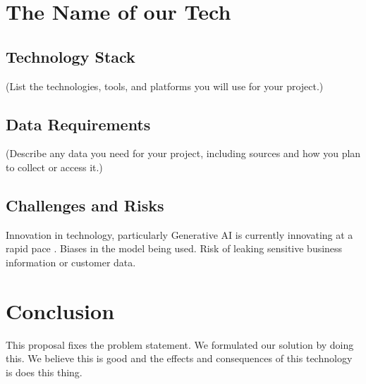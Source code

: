 \documentclass{article}
\begin{document}
\section{The Name of our Tech}
\subsection{Technology Stack}
(List the technologies, tools, and platforms you will use for your project.)
\subsection{Data Requirements}
(Describe any data you need for your project, including sources and how you plan to collect or access it.)

\subsection{Challenges and Risks}
Innovation in technology, particularly Generative AI is currently innovating at a rapid pace \parencite{weisz_design_2024}. Biases in the model being used. Risk of leaking sensitive business information or customer data.

\section{Conclusion}
This proposal fixes the problem statement. We formulated our solution by doing this. We believe this is good and the effects and consequences of this technology is does this thing.


\printbibliography
\end{document}
